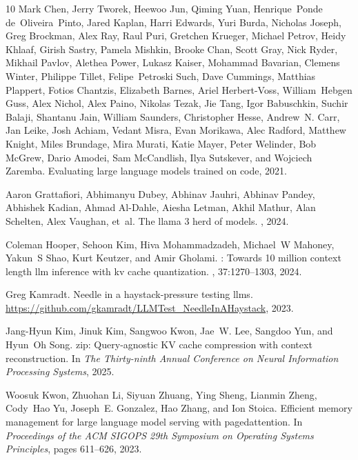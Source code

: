 \documentclass{llmxive}
\begin{document}
\begin{thebibliography}{10}
Mark Chen, Jerry Tworek, Heewoo Jun, Qiming Yuan, Henrique~Ponde de~Oliveira~Pinto, Jared Kaplan, Harri Edwards, Yuri Burda, Nicholas Joseph, Greg Brockman, Alex Ray, Raul Puri, Gretchen Krueger, Michael Petrov, Heidy Khlaaf, Girish Sastry, Pamela Mishkin, Brooke Chan, Scott Gray, Nick Ryder, Mikhail Pavlov, Alethea Power, Lukasz Kaiser, Mohammad Bavarian, Clemens Winter, Philippe Tillet, Felipe~Petroski Such, Dave Cummings, Matthias Plappert, Fotios Chantzis, Elizabeth Barnes, Ariel Herbert-Voss, William~Hebgen Guss, Alex Nichol, Alex Paino, Nikolas Tezak, Jie Tang, Igor Babuschkin, Suchir Balaji, Shantanu Jain, William Saunders, Christopher Hesse, Andrew~N. Carr, Jan Leike, Josh Achiam, Vedant Misra, Evan Morikawa, Alec Radford, Matthew Knight, Miles Brundage, Mira Murati, Katie Mayer, Peter Welinder, Bob McGrew, Dario Amodei, Sam McCandlish, Ilya Sutskever, and Wojciech Zaremba.
\newblock Evaluating large language models trained on code, 2021.

Aaron Grattafiori, Abhimanyu Dubey, Abhinav Jauhri, Abhinav Pandey, Abhishek Kadian, Ahmad Al-Dahle, Aiesha Letman, Akhil Mathur, Alan Schelten, Alex Vaughan, et~al.
\newblock The llama 3 herd of models.
, 2024.

Coleman Hooper, Sehoon Kim, Hiva Mohammadzadeh, Michael~W Mahoney, Yakun~S Shao, Kurt Keutzer, and Amir Gholami.
: Towards 10 million context length llm inference with kv cache quantization.
, 37:1270--1303, 2024.

Greg Kamradt.
\newblock Needle in a haystack-pressure testing llms.
\newblock \url{https://github.com/gkamradt/LLMTest_NeedleInAHaystack}, 2023.

Jang-Hyun Kim, Jinuk Kim, Sangwoo Kwon, Jae~W. Lee, Sangdoo Yun, and Hyun~Oh Song.
zip: Query-agnostic {KV} cache compression with context reconstruction.
\newblock In {\em The Thirty-ninth Annual Conference on Neural Information Processing Systems}, 2025.

Woosuk Kwon, Zhuohan Li, Siyuan Zhuang, Ying Sheng, Lianmin Zheng, Cody~Hao Yu, Joseph~E. Gonzalez, Hao Zhang, and Ion Stoica.
\newblock Efficient memory management for large language model serving with pagedattention.
\newblock In {\em Proceedings of the ACM SIGOPS 29th Symposium on Operating Systems Principles}, pages 611--626, 2023.


\end{thebibliography}
\end{document}
